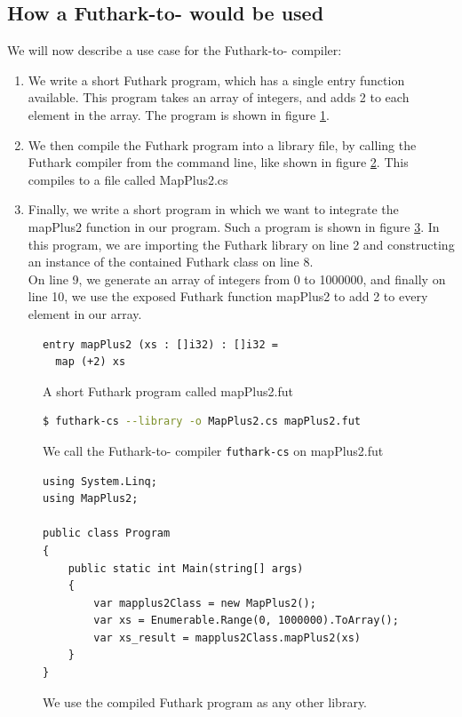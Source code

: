 \subsection*{How a Futhark-to-\csharp{} would be used}
We will now describe a use case for the Futhark-to-\csharp{} compiler:
\begin{enumerate}
\item We write a short Futhark program, which has a single entry function
  available. This program takes an array of integers, and
adds 2 to each element in the array. The program is shown in figure \ref{fig:shortfutharkprogram3}. 
\item We then compile the Futhark program into a library file, by calling the
  Futhark compiler from the command line, like shown in figure \ref{fig:shortfutharkprogram4}.
This compiles  to a \csharp{} file called MapPlus2.cs

\item Finally, we write a short \csharp{} program in which we want to integrate
  the mapPlus2 function in our program. Such a program is shown in figure \ref{fig:shortfutharkprogram5}.
  In this program, we are importing the Futhark library on line 2 and constructing
  an instance of the contained Futhark class on line 8.\\
  On line 9, we generate an array of integers from 0 to 1000000, and finally
  on line 10, we use the exposed Futhark function mapPlus2 to add 2 to every
  element in our array.
\end{enumerate}
\begin{figure}[H]
  \centering
  \begin{lstlisting}[language=Futhark]
entry mapPlus2 (xs : []i32) : []i32 =
  map (+2) xs
  \end{lstlisting}
  \caption{A short Futhark program called mapPlus2.fut}
  \label{fig:shortfutharkprogram3}
\end{figure}

\begin{figure}[H]
  \centering
  \begin{lstlisting}[language=sh]
$ futhark-cs --library -o MapPlus2.cs mapPlus2.fut
  \end{lstlisting}
  \caption{We call the Futhark-to-\csharp{} compiler \texttt{futhark-cs} on
    mapPlus2.fut}
  \label{fig:shortfutharkprogram4}
\end{figure}

\begin{figure}[H]
  \centering
\begin{verbatim}
using System.Linq;
using MapPlus2;

public class Program
{
    public static int Main(string[] args)
    {
        var mapplus2Class = new MapPlus2();
        var xs = Enumerable.Range(0, 1000000).ToArray();
        var xs_result = mapplus2Class.mapPlus2(xs)
    }
}
\end{verbatim}
  \caption{We use the compiled Futhark program as any other library.}
  \label{fig:shortfutharkprogram5}
\end{figure}

